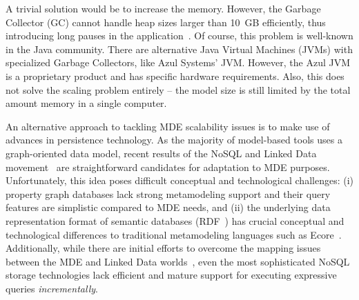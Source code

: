 A trivial solution would be to increase the memory. However, the Garbage Collector (GC) cannot handle heap sizes larger than 10~GB efficiently, thus introducing long pauses in the application~\cite{Azul}. Of course, this problem is well-known in the Java community. There are alternative Java Virtual Machines (JVMs) with specialized Garbage Collectors, like Azul Systems' JVM. However, the Azul JVM is a proprietary product and has specific hardware requirements. Also, this does not solve the scaling problem entirely -- the model size is still limited by the total amount memory in a single computer.

An alternative approach to tackling MDE scalability issues is to make use of advances in persistence technology. As the majority of model-based tools uses a graph-oriented data model, recent results of the NoSQL and Linked Data movement~\cite{neo4j,openvirtuoso,sesame} are straightforward candidates for adaptation to MDE purposes. Unfortunately, this idea poses difficult conceptual and technological challenges: (i) property graph databases lack strong metamodeling support and their query features are simplistic compared to MDE needs, and (ii) the underlying data representation format of semantic databases (RDF~\cite{website:rdf_standard}) has crucial conceptual and technological differences to traditional metamodeling languages such as Ecore~\cite{EMF}. Additionally, while there are initial efforts to overcome the mapping issues between the MDE and Linked Data worlds~\cite{hillairet2008bridging}, even the most sophisticated NoSQL storage technologies lack efficient and mature support for executing expressive queries \emph{incrementally}.



